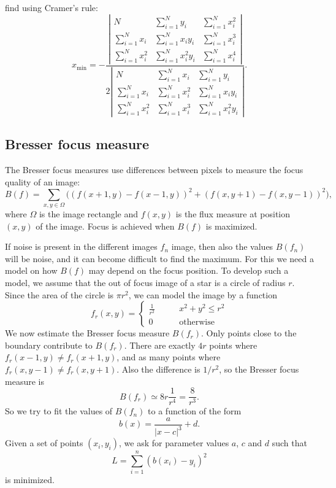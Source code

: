 find using Cramer's rule:
\[
x_{\text{min}}
=
-\frac{
\left|\begin{matrix}
           N       & \sum_{i=1}^N      y_i & \sum_{i=1}^N x_i^2 \\
\sum_{i=1}^N x_i   & \sum_{i=1}^N x_i  y_i & \sum_{i=1}^N x_i^3 \\
\sum_{i=1}^N x_i^2 & \sum_{i=1}^N x_i^2y_i & \sum_{i=1}^N x_i^4 
\end{matrix}\right|
}{
2\left|\begin{matrix}
           N       & \sum_{i=1}^N x_i   & \sum_{i=1}^N      y_i \\
\sum_{i=1}^N x_i   & \sum_{i=1}^N x_i^2 & \sum_{i=1}^N x_i  y_i \\
\sum_{i=1}^N x_i^2 & \sum_{i=1}^N x_i^3 & \sum_{i=1}^N x_i^2y_i 
\end{matrix}\right|
}.
\]

\subsection{Bresser focus measure}
The Bresser focus measures use differences between pixels to measure
the focus quality of an image:
\[
B(f)
=
\sum_{x,y\in \Omega}
\bigl((f(x+1,y)-f(x-1,y))^2
+
(f(x,y+1)-f(x,y-1))^2\bigr),
\]
where $\Omega$ is the image rectangle and $f(x,y)$ is the flux measure
at position $(x,y)$ of the image.
Focus is achieved when $B(f)$ is maximized.

If noise is present in the different images $f_n$ image, then also the
values $B(f_n)$ will be noise, and it can become difficult to find the
maximum.
For this we need a model on how $B(f)$ may depend on the focus position.
To develop such a model, we assume that the out of focus image of a star
is a circle of radius $r$. 
Since the area of the circle is $\pi r^2$, we can model the image by
a function
\[
f_r(x,y)
=
\begin{cases}
\frac1{r^2}&\qquad x^2+y^2\le r^2\\
0          &\qquad\text{otherwise}
\end{cases}
\]
We now estimate the Bresser focus measure $B(f_r)$.
Only points close to the boundary contribute to $B(f_r)$.
There are exactly $4r$ points where $f_r(x-1,y)\ne f_r(x+1,y)$, and
as many points where $f_r(x,y-1)\ne f_r(x,y+1)$.
Also the difference is $1/r^2$, so the Bresser focus measure is
\[
B(f_r)\simeq 8r \frac1{r^4}=\frac8{r^3}.
\]
So we try to fit the values of $B(f_n)$ to a function of the form
\[
b(x)=\frac{a}{|x-c|^3}+d.
\]
Given a set of points $(x_i,y_i)$, we ask for parameter values
$a$, $c$ and $d$ such that
\[
L=\sum_{i=1}^n(b(x_i)-y_i)^2
\]
is minimized.

